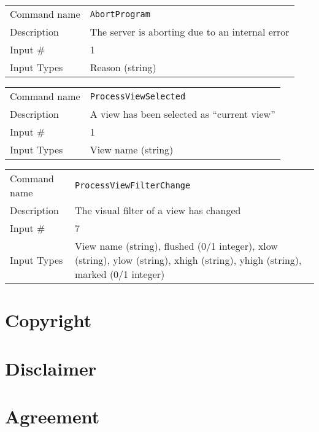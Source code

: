 \bigskip

\noindent
\begin{tabular}{l|p{5in}}
\hline
Command name & {\tt AbortProgram} \\
Description  & The server is aborting due to an internal error \\
Input \#     & 1 \\
Input Types  & Reason (string) \\
\hline
\end{tabular}

\bigskip

\noindent
\begin{tabular}{l|p{5in}}
\hline
Command name & {\tt ProcessViewSelected} \\
Description  & A view has been selected as ``current view'' \\
Input \#     & 1 \\
Input Types  & View name (string) \\
\hline
\end{tabular}

\bigskip

\noindent
\begin{tabular}{l|p{5in}}
\hline
Command name & {\tt ProcessViewFilterChange} \\
Description  & The visual filter of a view has changed \\
Input \#     & 7 \\
Input Types  & View name (string), flushed (0/1 integer), xlow (string),
               ylow (string), xhigh (string), yhigh (string),
               marked (0/1 integer) \\
\hline
\end{tabular}

\newpage 
\section*{Copyright}



\section*{Disclaimer}



\newpage
\section*{Agreement}




